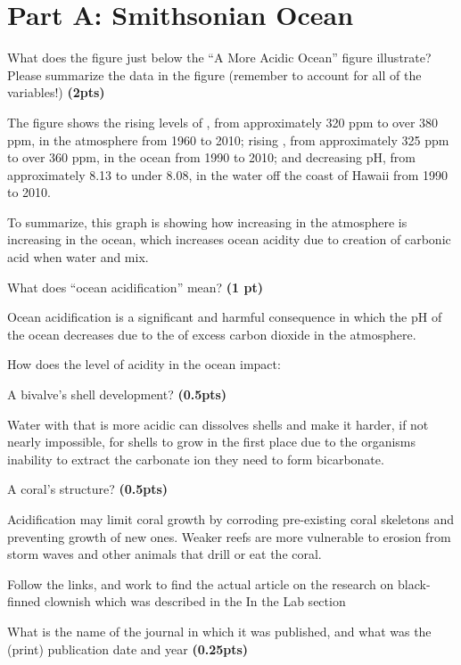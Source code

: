 \documentclass[12pt,letterpaper]{article}
\begin{document}
\section*{Part A: Smithsonian Ocean}
\begin{enumerate}[font=\bfseries, wide]
    {\color{under}\item What does the figure just below the  “A More Acidic Ocean” figure illustrate? Please summarize the data in the figure (remember to account for all of the variables!) \textbf{(2pts)}}

    The figure shows the rising levels of , from approximately 320 ppm to over 380 ppm, in the atmosphere from 1960 to 2010; rising , from approximately 325 ppm to over 360 ppm, in the ocean from 1990 to 2010; and decreasing pH, from approximately 8.13 to under 8.08, in the water off the coast of Hawaii from 1990 to 2010.\par 

    To summarize, this graph is showing how increasing  in the atmosphere is increasing  in the ocean, which increases ocean acidity due to creation of carbonic acid when water and  mix. 

    {\color{under}\item What does “ocean acidification” mean? \textbf{(1 pt)}}

    Ocean acidification is a significant and harmful consequence in which the pH of the ocean decreases due to the of excess carbon dioxide in the atmosphere. 

    {\color{under}\item How does the level of acidity in the ocean impact:}
    \begin{enumerate}
        {\color{under}\item  A bivalve’s shell development? \textbf{(0.5pts)}}

        Water with that is more acidic can dissolves shells and make it harder, if not nearly impossible, for shells to grow in the first place due to the organisms inability to extract the carbonate ion they need to form bicarbonate. 

        {\color{under}\item  A coral’s structure? \textbf{(0.5pts)}}

        Acidification may limit coral growth by corroding pre-existing coral skeletons and preventing growth of new ones. Weaker reefs are more vulnerable to erosion from storm waves and other animals that drill or eat the coral. 
    \end{enumerate}
    \newpage
    {\color{under}\item Follow the links, and work to find the actual article on the research on black-finned clownish which was described in the In the Lab section}
    \begin{enumerate}
        {\color{under}\item What is the name of the journal in which it was published, and what was the (print) publication date and year \textbf{(0.25pts)}}


\end{enumerate}
\end{enumerate}
\end{document}
